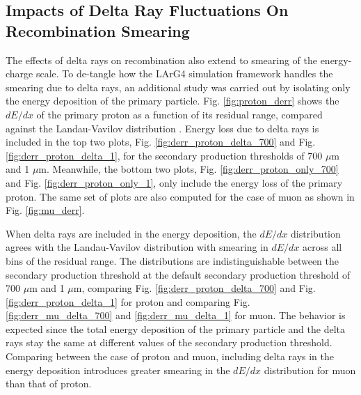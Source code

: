 \subsection{Impacts of Delta Ray Fluctuations On Recombination Smearing}
\label{sec:impactDeltaRaySmear}

The effects of delta rays on recombination also extend to smearing of the energy-charge scale.
To de-tangle how the LArG4 simulation framework handles the smearing due to delta rays, an additional study was carried out by isolating only the energy deposition of the primary particle.
Fig. \ref{fig:proton_derr} shows the $dE/dx$ of the primary proton as a function of its residual range, compared against the Landau-Vavilov distribution \cite{Passage}.
Energy loss due to delta rays is included in the top two plots, Fig. \ref{fig:derr_proton_delta_700} and Fig. \ref{fig:derr_proton_delta_1}, for the secondary production thresholds of 700 $\mu$m and 1 $\mu$m.
Meanwhile, the bottom two plots, Fig. \ref{fig:derr_proton_only_700} and Fig. \ref{fig:derr_proton_only_1}, only include the energy loss of the primary proton.
The same set of plots are also computed for the case of muon as shown in Fig. \ref{fig:mu_derr}.

When delta rays are included in the energy deposition, the $dE/dx$ distribution agrees with the Landau-Vavilov distribution with smearing in $dE/dx$ across all bins of the residual range.
The distributions are indistinguishable between the secondary production threshold at the default secondary production threshold of 700 $\mu$m and 1 $\mu$m, comparing Fig. \ref{fig:derr_proton_delta_700} and Fig. \ref{fig:derr_proton_delta_1} for proton and comparing Fig. \ref{fig:derr_mu_delta_700} and \ref{fig:derr_mu_delta_1} for muon. 
The behavior is expected since the total energy deposition of the primary particle and the delta rays stay the same at different values of the secondary production threshold.
Comparing between the case of proton and muon, including delta rays in the energy deposition introduces greater smearing in the $dE/dx$ distribution for muon than that of proton.

